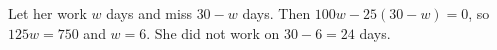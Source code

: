 Let her work $w$ days and miss $30-w$ days. Then $100w-25(30-w)=0$, so $125w=750$ and $w=6$. She did not work on $30-6=\boxed{24}$ days.

